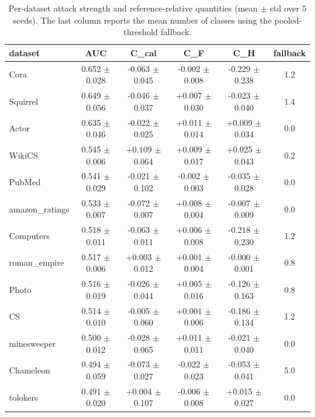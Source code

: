 \begin{table}
\caption{Per-dataset attack strength and reference-relative quantities (mean $\pm$ std over 5 seeds). The last column reports the mean number of classes using the pooled-threshold fallback.}
\label{tab:rq_summary}
\begin{tabular}{lccccc}
\toprule
dataset & AUC & C_cal & C_F & C_H & fallback \\
\midrule
Cora & 0.652 $\pm$ 0.028 & -0.063 $\pm$ 0.045 & -0.002 $\pm$ 0.008 & -0.229 $\pm$ 0.238 & 1.2 \\
Squirrel & 0.649 $\pm$ 0.056 & -0.046 $\pm$ 0.037 & +0.007 $\pm$ 0.030 & -0.023 $\pm$ 0.040 & 1.4 \\
Actor & 0.635 $\pm$ 0.046 & -0.022 $\pm$ 0.025 & +0.011 $\pm$ 0.014 & +0.009 $\pm$ 0.034 & 0.0 \\
WikiCS & 0.545 $\pm$ 0.006 & +0.109 $\pm$ 0.064 & +0.009 $\pm$ 0.017 & +0.025 $\pm$ 0.043 & 0.2 \\
PubMed & 0.541 $\pm$ 0.029 & -0.021 $\pm$ 0.102 & -0.002 $\pm$ 0.003 & -0.035 $\pm$ 0.028 & 0.0 \\
amazon_ratings & 0.533 $\pm$ 0.007 & -0.072 $\pm$ 0.007 & +0.008 $\pm$ 0.004 & -0.007 $\pm$ 0.009 & 0.0 \\
Computers & 0.518 $\pm$ 0.011 & -0.063 $\pm$ 0.011 & +0.006 $\pm$ 0.008 & -0.218 $\pm$ 0.230 & 1.2 \\
roman_empire & 0.517 $\pm$ 0.006 & +0.003 $\pm$ 0.012 & +0.001 $\pm$ 0.004 & -0.000 $\pm$ 0.001 & 0.8 \\
Photo & 0.516 $\pm$ 0.019 & -0.026 $\pm$ 0.044 & +0.005 $\pm$ 0.016 & -0.126 $\pm$ 0.163 & 0.8 \\
CS & 0.514 $\pm$ 0.010 & -0.005 $\pm$ 0.060 & +0.001 $\pm$ 0.006 & -0.186 $\pm$ 0.134 & 1.2 \\
minesweeper & 0.500 $\pm$ 0.012 & -0.028 $\pm$ 0.065 & +0.011 $\pm$ 0.011 & -0.021 $\pm$ 0.040 & 0.0 \\
Chameleon & 0.494 $\pm$ 0.059 & -0.073 $\pm$ 0.027 & -0.022 $\pm$ 0.023 & -0.053 $\pm$ 0.041 & 5.0 \\
tolokers & 0.491 $\pm$ 0.020 & +0.004 $\pm$ 0.107 & -0.006 $\pm$ 0.008 & +0.015 $\pm$ 0.027 & 0.0 \\
\bottomrule
\end{tabular}
\end{table}
